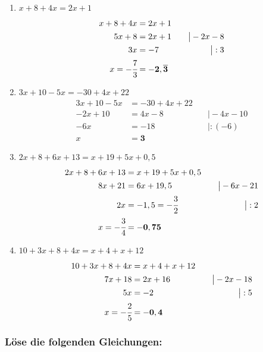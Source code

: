 \documentclass[a4paper,10pt]{article} %
\begin{document}
\begin{enumerate}[label=\alph*)]
  \item \(x + 8 + 4x = 2x + 1\)
  \[
    \begin{aligned}
      x + 8 + 4x &= 2x + 1 \\
      5x + 8 &= 2x + 1 &\quad\big| - 2x - 8 \\
      3x &= -7 &\quad\big| : 3 \\
      x = -\cfrac{7}{3} &= \mathbf{-2,\overline{3}}
    \end{aligned}
  \]

  \item \(3x + 10 - 5x = -30 + 4x + 22\)
  \[
    \begin{aligned}
      3x + 10 - 5x &= -30 + 4x + 22 \\
      -2x + 10 &= 4x - 8 &\quad\big| - 4x - 10 \\
      -6x &= -18 &\quad\big| : (-6) \\
      x &= \mathbf{3}
    \end{aligned}
  \]

  \item \(2x + 8 + 6x + 13 = x + 19 + 5x + 0,5\)
  \[
    \begin{aligned}
      2x + 8 + 6x + 13 &= x + 19 + 5x + 0,5 \\
      8x + 21 &= 6x + 19,5 &\quad\big| - 6x - 21 \\
      2x &= -1,5 = -\cfrac{3}{2} &\quad\big| : 2 \\
      x = -\cfrac{3}{4} &= \mathbf{-0,75}
    \end{aligned}
  \]

  \item \(10 + 3x + 8 + 4x = x + 4 + x + 12\)
  \[
    \begin{aligned}
      10 + 3x + 8 + 4x &= x + 4 + x + 12 \\
      7x + 18 &= 2x + 16 &\quad\big| - 2x - 18 \\
      5x &= -2 &\quad\big| : 5 \\
      x = -\cfrac{2}{5} &= \mathbf{-0,4}
    \end{aligned}
  \]

\end{enumerate}

\subsubsection{Löse die folgenden Gleichungen:} %
\end{document}
